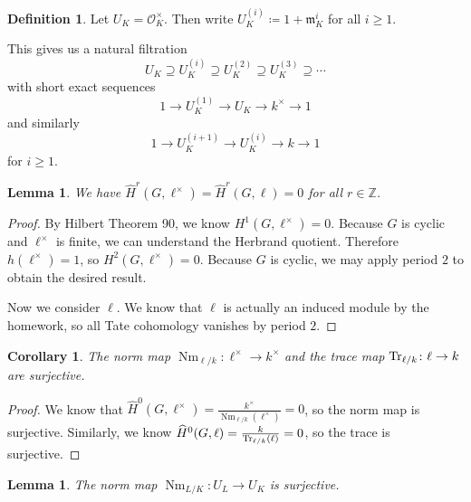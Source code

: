 \documentclass[leqno, openany]{memoir}
\newtheorem{cor}[thm]{Corollary}
\newtheorem{lem}[thm]{Lemma}
\theoremstyle{definition}
\newtheorem{defn}[thm]{Definition}
\theoremstyle{remark}
\theoremstyle{plain}
\theoremstyle{definition}
\theoremstyle{remark}
\newcommand{\Z}{\mathbb{Z}}
\newcommand{\mc}[1]{\mathcal{#1}}
\newcommand{\mf}[1]{\mathfrak{#1}}
\newcommand{\wh}[1]{\widehat{#1}}
\DeclareMathOperator{\Nm}{Nm}
\begin{document}
\begin{defn}
    Let $U_K = \mc{O}_K^{\times}$. Then write $U_K^{(i)} \coloneqq 1 + \mf{m}_K^i$ for all $i \geq 1$. 
\end{defn}
This gives us a natural filtration
\[ U_K \supseteq U_K^{(i)} \supseteq U_K^{(2)} \supseteq U_K^{(3)} \supseteq \cdots \]
with short exact sequences
\[ 1 \to U_K^{(1)} \to U_K \to k^{\times} \to 1 \]
and similarly
\[ 1 \to U_K^{(i+1)} \to U_K^{(i)} \to k \to 1 \]
for $i \geq 1$.

\begin{lem}
    We have $\wh{H}^r(G, \ell^{\times}) = \wh{H}^r(G, \ell) = 0$ for all $r \in \Z$.
\end{lem}

\begin{proof}
    By Hilbert Theorem 90, we know $H^1(G, \ell^{\times}) = 0$. Because $G$ is cyclic and $\ell^{\times}$ is finite, we can understand the Herbrand quotient. Therefore $h(\ell^{\times}) = 1$, so $H^2(G, \ell^{\times}) = 0$. Because $G$ is cyclic, we may apply period $2$ to obtain the desired result.

    Now we consider $\ell$. We know that $\ell$ is actually an induced module by the homework, so all Tate cohomology vanishes by period $2$.
\end{proof}

\begin{cor}
    The norm map $\Nm_{\ell/k} \colon \ell^{\times} \to k^{\times}$ and the trace map $\Tr_{\ell/k} \colon \ell \to k$ are surjective.
\end{cor}

\begin{proof}
    We know that $\wh{H}^0(G, \ell^{\times}) = \frac{k^{\times}}{\Nm_{\ell/k}(\ell^{\times})} = 0$, so the norm map is surjective. Similarly, we know $\wh{H}^0(G, \ell) = \frac{k}{\Tr_{\ell/k}(\ell)} = 0$, so the trace is surjective.
\end{proof}

\begin{lem}
    The norm map $\Nm_{L/K} \colon U_L \to U_K$ is surjective.
\end{lem}
\end{document}
